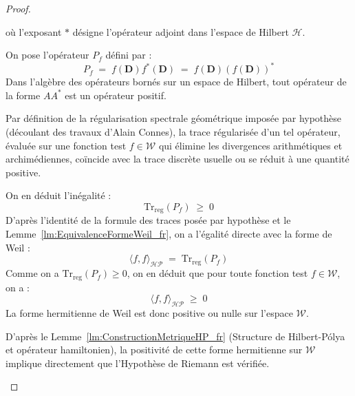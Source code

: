 \documentclass[Riemann_Hypothesis.tex]{subfiles}
\begin{document}
\begin{proof}
\begin{part_proof}
        où l'exposant $*$ désigne l'opérateur adjoint dans l'espace de Hilbert $\mathcal{H}$. \par
        On pose l'opérateur $P_f$ défini par :
        \begin{equation*}
            P_f \;=\; f(\mathbf{D}) f^*(\mathbf{D}) \;=\; f(\mathbf{D}) (f(\mathbf{D}))^*
        \end{equation*}
        Dans l'algèbre des opérateurs bornés sur un espace de Hilbert, tout opérateur de la forme $A A^*$ est un opérateur positif. \par
        Par définition de la régularisation spectrale géométrique imposée par hypothèse (découlant des travaux d'Alain Connes), la trace régularisée d'un tel opérateur, évaluée sur une fonction test $f \in \mathcal{W}$ qui élimine les divergences arithmétiques et archimédiennes, coïncide avec la trace discrète usuelle ou se réduit à une quantité positive. \par
        On en déduit l'inégalité :
        \begin{equation*}
            \mathrm{Tr}_{\mathrm{reg}}\left( P_f \right) \;\ge\; 0
        \end{equation*}
        D'après l'identité de la formule des traces posée par hypothèse et le Lemme~\ref{lm:EquivalenceFormeWeil_fr}, on a l'égalité directe avec la forme de Weil :
        \begin{equation*}
            \langle f, f \rangle_{\mathcal{HP}} \;=\; \mathrm{Tr}_{\mathrm{reg}}\left( P_f \right)
        \end{equation*}
        Comme on a $\mathrm{Tr}_{\mathrm{reg}}\left( P_f \right) \ge 0$, on en déduit que pour toute fonction test $f \in \mathcal{W}$, on a :
        \begin{equation*}
            \langle f, f \rangle_{\mathcal{HP}} \;\ge\; 0
        \end{equation*}
        La forme hermitienne de Weil est donc positive ou nulle sur l'espace $\mathcal{W}$. \par
        D'après le Lemme~\ref{lm:ConstructionMetriqueHP_fr} (Structure de Hilbert-Pólya et opérateur hamiltonien), la positivité de cette forme hermitienne sur $\mathcal{W}$ implique directement que l'Hypothèse de Riemann est vérifiée.
    \end{part_proof}


\end{proof}
\end{document}
